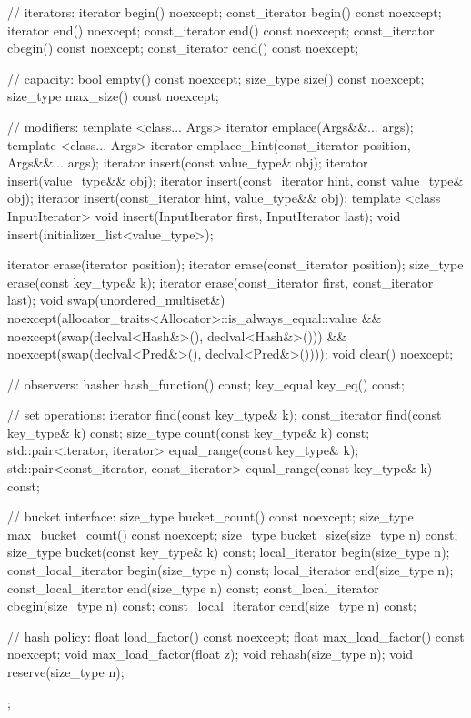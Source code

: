 \begin{codeblock}
{{    // iterators:
    iterator       begin() noexcept;
    const_iterator begin() const noexcept;
    iterator       end() noexcept;
    const_iterator end() const noexcept;
    const_iterator cbegin() const noexcept;
    const_iterator cend() const noexcept;

    // capacity:
    bool      empty() const noexcept;
    size_type size() const noexcept;
    size_type max_size() const noexcept;

    // modifiers:
    template <class... Args> iterator emplace(Args&&... args);
    template <class... Args> iterator emplace_hint(const_iterator position, Args&&... args);
    iterator insert(const value_type& obj);
    iterator insert(value_type&& obj);
    iterator insert(const_iterator hint, const value_type& obj);
    iterator insert(const_iterator hint, value_type&& obj);
    template <class InputIterator> void insert(InputIterator first, InputIterator last);
    void insert(initializer_list<value_type>);

    iterator  erase(iterator position);
    iterator  erase(const_iterator position);
    size_type erase(const key_type& k);
    iterator  erase(const_iterator first, const_iterator last);
    void      swap(unordered_multiset&)
      noexcept(allocator_traits<Allocator>::is_always_equal::value &&
               noexcept(swap(declval<Hash&>(), declval<Hash&>())) &&
               noexcept(swap(declval<Pred&>(), declval<Pred&>())));
    void      clear() noexcept;

    // observers:
    hasher hash_function() const;
    key_equal key_eq() const;

    // set operations:
    iterator       find(const key_type& k);
    const_iterator find(const key_type& k) const;
    size_type      count(const key_type& k) const;
    std::pair<iterator, iterator>             equal_range(const key_type& k);
    std::pair<const_iterator, const_iterator> equal_range(const key_type& k) const;

    // bucket interface:
    size_type bucket_count() const noexcept;
    size_type max_bucket_count() const noexcept;
    size_type bucket_size(size_type n) const;
    size_type bucket(const key_type& k) const;
    local_iterator begin(size_type n);
    const_local_iterator begin(size_type n) const;
    local_iterator end(size_type n);
    const_local_iterator end(size_type n) const;
    const_local_iterator cbegin(size_type n) const;
    const_local_iterator cend(size_type n) const;

    // hash policy:
    float load_factor() const noexcept;
    float max_load_factor() const noexcept;
    void max_load_factor(float z);
    void rehash(size_type n);
    void reserve(size_type n);
  };

}
\end{codeblock}
